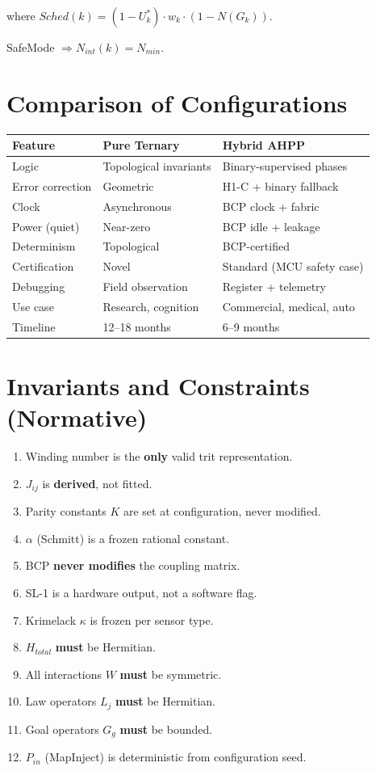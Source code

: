 \documentclass[11pt, a4paper]{report}
\begin{document}
where $Sched(k) = (1 - U^*_k) \cdot w_k \cdot (1 - N(G_k))$.

SafeMode $\Rightarrow N_{int}(k) = N_{min}$.

\chapter{Comparison of Configurations}

\begin{center}
\begin{tabular}{@{}p{3.5cm}p{5cm}p{5cm}@{}}
\toprule
\textbf{Feature} & \textbf{Pure Ternary} & \textbf{Hybrid AHPP} \\
\midrule
Logic & Topological invariants & Binary-supervised phases \\
Error correction & Geometric & H1-C + binary fallback \\
Clock & Asynchronous & BCP clock + fabric \\
Power (quiet) & Near-zero & BCP idle + leakage \\
Determinism & Topological & BCP-certified \\
Certification & Novel & Standard (MCU safety case) \\
Debugging & Field observation & Register + telemetry \\
Use case & Research, cognition & Commercial, medical, auto \\
Timeline & 12--18 months & 6--9 months \\
\bottomrule
\end{tabular}
\end{center}

\chapter{Invariants and Constraints (Normative)}

\begin{enumerate}
  \item Winding number is the \textbf{only} valid trit representation.
  \item $J_{ij}$ is \textbf{derived}, not fitted.
  \item Parity constants $K$ are set at configuration, never modified.
  \item $\alpha$ (Schmitt) is a frozen rational constant.
  \item BCP \textbf{never modifies} the coupling matrix.
  \item SL-1 is a hardware output, not a software flag.
  \item Krimelack $\kappa$ is frozen per sensor type.
  \item $H_{total}$ \textbf{must} be Hermitian.
  \item All interactions $W$ \textbf{must} be symmetric.
  \item Law operators $L_j$ \textbf{must} be Hermitian.
  \item Goal operators $G_g$ \textbf{must} be bounded.
  \item $P_{in}$ (MapInject) is deterministic from configuration seed.
\end{enumerate}
\end{document}
